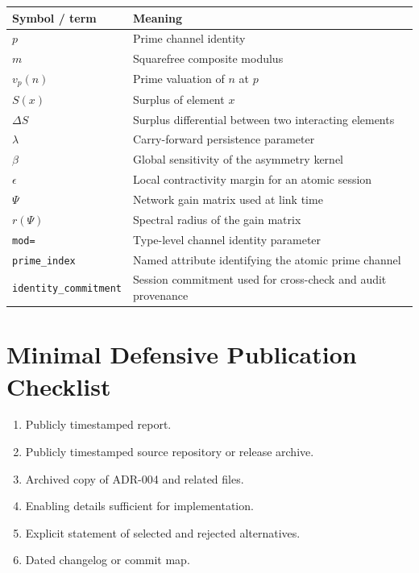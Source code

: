\documentclass[11pt]{article}
\begin{document}
\begin{center}
\begin{tabularx}{\linewidth}{@{}lX@{}}
\toprule
Symbol / term & Meaning \\
\midrule
\(p\) & Prime channel identity \\
\(m\) & Squarefree composite modulus \\
\(v_p(n)\) & Prime valuation of \(n\) at \(p\) \\
\(S(x)\) & Surplus of element \(x\) \\
\(\Delta S\) & Surplus differential between two interacting elements \\
\(\lambda\) & Carry-forward persistence parameter \\
\(\beta\) & Global sensitivity of the asymmetry kernel \\
\(\epsilon\) & Local contractivity margin for an atomic session \\
\(\Psi\) & Network gain matrix used at link time \\
\(r(\Psi)\) & Spectral radius of the gain matrix \\
\texttt{mod=} & Type-level channel identity parameter \\
\texttt{prime\_index} & Named attribute identifying the atomic prime channel \\
\texttt{identity\_commitment} & Session commitment used for cross-check and audit provenance \\
\bottomrule
\end{tabularx}
\end{center}

\section{Minimal Defensive Publication Checklist}

\begin{enumerate}[leftmargin=2em]
  \item Publicly timestamped report.
  \item Publicly timestamped source repository or release archive.
  \item Archived copy of ADR-004 and related files.
  \item Enabling details sufficient for implementation.
  \item Explicit statement of selected and rejected alternatives.
  \item Dated changelog or commit map.
\end{enumerate}
\end{document}
